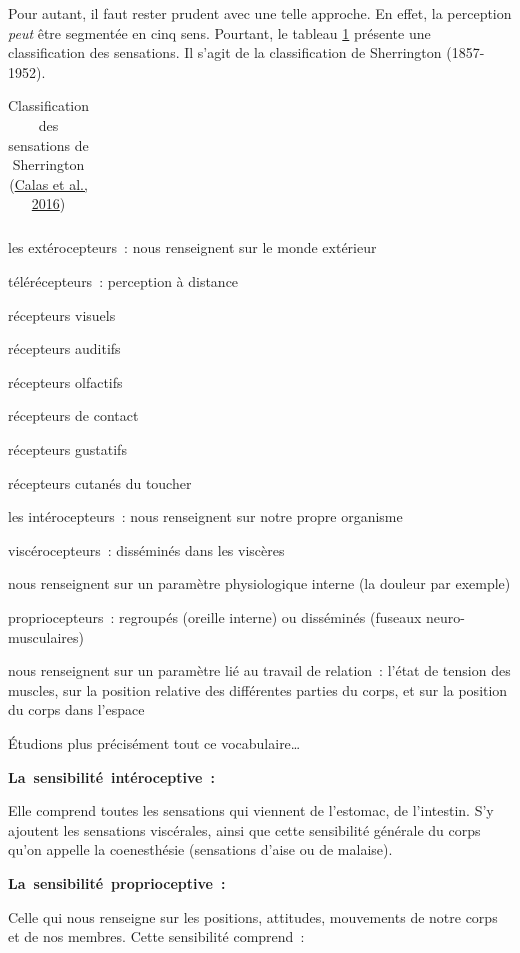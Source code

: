 \documentclass[
]{book}
\begin{document}
Pour autant, il faut rester prudent avec une telle approche. En effet, la
perception \emph{peut} être segmentée en cinq sens. Pourtant, le
tableau \ref{tab:perception} présente une classification
des sensations. Il s'agit de la classification de Sherrington
(1857-1952).

\begin{longtable}[]{@{}l@{}}
\caption{\label{tab:perception} Classification des sensations de Sherrington
(\protect\hyperlink{ref-calas2016precis}{Calas et al., 2016})}\tabularnewline
\toprule()
\endhead
\bottomrule()
\end{longtable}

les extérocepteurs~:
nous renseignent sur le monde extérieur

télérécepteurs~:
perception à distance

récepteurs visuels

récepteurs auditifs

récepteurs olfactifs

récepteurs de
contact

récepteurs gustatifs

récepteurs cutanés du toucher

les
intérocepteurs~: nous renseignent sur notre propre organisme

viscérocepteurs~:
disséminés dans les viscères

nous renseignent sur un paramètre
physiologique interne (la douleur par exemple)

propriocepteurs~:
regroupés (oreille interne) ou disséminés (fuseaux
neuro-musculaires)

nous renseignent sur un paramètre lié
au travail de relation~: l'état de tension des muscles, sur la
position relative des différentes parties du corps, et sur la
position du corps dans l'espace

Étudions plus précisément tout ce vocabulaire\ldots{}

\textbf{La~sensibilité~intéroceptive~:}

Elle comprend toutes les sensations qui viennent
de l'estomac, de l'intestin. S'y ajoutent les sensations viscérales, ainsi
que cette sensibilité générale du corps qu'on appelle la coenesthésie
(sensations d'aise ou de malaise).

\textbf{La~sensibilité~proprioceptive~:}

Celle qui nous renseigne sur les positions, attitudes, mouvements de
notre corps et de nos membres. Cette sensibilité comprend~:
\end{document}
